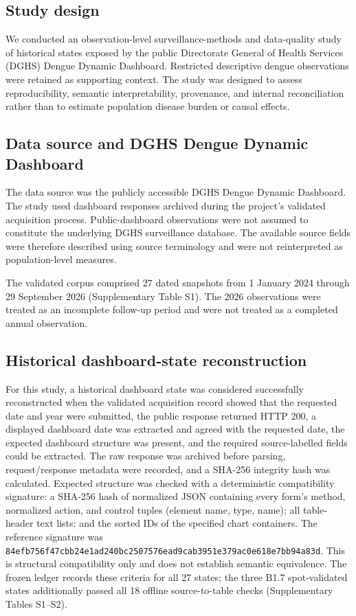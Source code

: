 \subsection{Study design}

We conducted an observation-level surveillance-methods and data-quality study of historical states exposed by the public Directorate General of Health Services (DGHS) Dengue Dynamic Dashboard. Restricted descriptive dengue observations were retained as supporting context. The study was designed to assess reproducibility, semantic interpretability, provenance, and internal reconciliation rather than to estimate population disease burden or causal effects.

\subsection{Data source and DGHS Dengue Dynamic Dashboard}

The data source was the publicly accessible DGHS Dengue Dynamic Dashboard. The study used dashboard responses archived during the project's validated acquisition process. Public-dashboard observations were not assumed to constitute the underlying DGHS surveillance database. The available source fields were therefore described using source terminology and were not reinterpreted as population-level measures.

The validated corpus comprised 27 dated snapshots from 1 January 2024 through 29 September 2026 (Supplementary Table S1). The 2026 observations were treated as an incomplete follow-up period and were not treated as a completed annual observation.

\subsection{Historical dashboard-state reconstruction}

For this study, a historical dashboard state was considered successfully reconstructed when the validated acquisition record showed that the requested date and year were submitted, the public response returned HTTP 200, a displayed dashboard date was extracted and agreed with the requested date, the expected dashboard structure was present, and the required source-labelled fields could be extracted. The raw response was archived before parsing, request/response metadata were recorded, and a SHA-256 integrity hash was calculated. Expected structure was checked with a deterministic compatibility signature: a SHA-256 hash of normalized JSON containing every form's method, normalized action, and control tuples (element name, type, name); all table-header text lists; and the sorted IDs of the specified chart containers. The reference signature was \texttt{84efb756f47cbb24e1ad240bc2507576ead9cab3951e379ac0e618e7bb94a83d}. This is structural compatibility only and does not establish semantic equivalence. The frozen ledger records these criteria for all 27 states; the three B1.7 spot-validated states additionally passed all 18 offline source-to-table checks (Supplementary Tables S1--S2).


